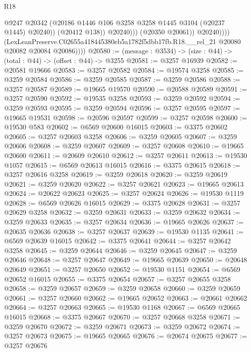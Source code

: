 \begin{lexlean}{R18}
\begin{coremodule}
                              @9247
                              @20342
                              (@20186 @1446 @106 @3258 @3258 @1445 @3104 (@20237 @1445) @20240))
                            (@20412 @138))
                          @20240)))
                    (@20350 @20061))
                  @20240))))
          (LexLeanPreserve.C02655a418445380eb5a1782f5dbb17fb.R18.__rel_21
            @20080
            @20082
            @20084
            @20086))))
@20580 := (message : @3534) -> (size : @44) -> (total : @44) -> (offset : @44) -> @3255
@20581 := @3257 @16939
@20582 := @20581 @19666
@20583 := @3257 @20582
@20584 := @19574 @3258
@20585 := @3259 @20584
@20586 := @3259 @20585
@20587 := @3259 @20586
@20588 := @3257 @20587
@20589 := @19665 @19570
@20590 := @20588 @20589
@20591 := @3257 @20590
@20592 := @19535 @3258
@20593 := @3259 @20592
@20594 := @3259 @20593
@20595 := @3259 @20594
@20596 := @3257 @20595
@20597 := @19665 @19531
@20598 := @20596 @20597
@20599 := @3257 @20598
@20600 := @19530 @583
@20602 := @6569 @20600 @16015
@20603 := @3375 @20602
@20605 := @3257 @20603 @3258
@20606 := @3259 @20605
@20607 := @3259 @20606
@20608 := @3259 @20607
@20609 := @3257 @20608
@20610 := @19665 @20600
@20611 := @20609 @20610
@20612 := @3257 @20611
@20613 := @19530 @1057
@20615 := @6569 @20613 @16015
@20616 := @3375 @20615
@20618 := @3257 @20616 @3258
@20619 := @3259 @20618
@20620 := @3259 @20619
@20621 := @3259 @20620
@20622 := @3257 @20621
@20623 := @19665 @20613
@20624 := @20622 @20623
@20625 := @3257 @20624
@20626 := @19530 @1119
@20628 := @6569 @20626 @16015
@20629 := @3375 @20628
@20631 := @3257 @20629 @3258
@20632 := @3259 @20631
@20633 := @3259 @20632
@20634 := @3259 @20633
@20635 := @3257 @20634
@20636 := @19665 @20626
@20637 := @20635 @20636
@20638 := @3257 @20637
@20639 := @19530 @1135
@20641 := @6569 @20639 @16015
@20642 := @3375 @20641
@20644 := @3257 @20642 @3258
@20645 := @3259 @20644
@20646 := @3259 @20645
@20647 := @3259 @20646
@20648 := @3257 @20647
@20649 := @19665 @20639
@20650 := @20648 @20649
@20651 := @3257 @20650
@20652 := @19530 @1151
@20654 := @6569 @20652 @16015
@20655 := @3375 @20654
@20657 := @3257 @20655 @3258
@20658 := @3259 @20657
@20659 := @3259 @20658
@20660 := @3259 @20659
@20661 := @3257 @20660
@20662 := @19665 @20652
@20663 := @20661 @20662
@20664 := @3257 @20663
@20665 := @19530 @1168
@20667 := @6569 @20665 @16015
@20668 := @3375 @20667
@20670 := @3257 @20668 @3258
@20671 := @3259 @20670
@20672 := @3259 @20671
@20673 := @3259 @20672
@20674 := @3257 @20673
@20675 := @19665 @20665
@20676 := @20674 @20675
@20677 := @3257 @20676

\end{coremodule}
\end{lexlean}
